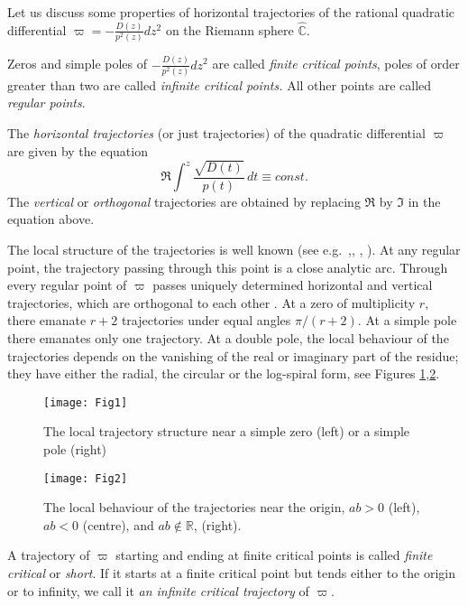 \documentclass[12pt]{amsart}
\begin{document}
Let us discuss some properties of horizontal trajectories of the rational
quadratic differential $\varpi =-\displaystyle\frac{D\left( z\right) }{p^{2}\left( z\right) }dz^{2}$ on the Riemann sphere $\hat{\mathbb{C}}.$

Zeros and simple poles of $-\displaystyle\frac{D\left( z\right) }{p^{2}\left( z\right) }dz^{2}$ are called \emph{finite critical points},
poles of order greater than two are called \emph{infinite critical points. }All other points are called \emph{regular points}.

The \emph{horizontal trajectories} (or just trajectories) of the quadratic
differential $\varpi $ are given by the equation 
\begin{equation}
\mathcal{\Re }\int^{z}\frac{\sqrt{D\left( t\right) }}{p\left( t\right) }\,dt\equiv const.  \label{re}
\end{equation}The \emph{vertical} or \emph{orthogonal} trajectories are obtained by
replacing $\Re $ by $\Im $ in the equation above.

The local structure of the trajectories is well known (see e.g.\cite{Strebel:84}~,\cite{MR0096806}, \cite{Pommerenke75}, \cite{MR1929066}). At
any regular point, the trajectory passing through this point is a close
analytic arc. Through every regular point of $\varpi $ passes uniquely
determined horizontal and vertical trajectories, which are orthogonal to
each other \cite[Theorem 5.5]{Strebel:84}. At a zero of multiplicity $r,$
there emanate $r+2$ trajectories under equal angles $\pi /\left( r+2\right) .
$ At a simple pole there emanates only one trajectory. At a double pole, the
local behaviour of the trajectories depends on the vanishing of the real or
imaginary part of the residue; they have either the radial, the circular or
the log-spiral form, see Figures \ref{Fig1},\ref{Fig2}.

\begin{figure}[h]
\begin{center}
\texttt{[image: Fig1]}
\caption[le titre]{ The local trajectory structure near a simple zero (left) or a simple pole (right)
}
\label{Fig1}
\end{center}
\end{figure}
\begin{figure}[h]
\begin{center}
\texttt{[image: Fig2]}
\caption[le titre]{ The local behaviour of the trajectories near the origin, $ab > 0$ (left), $ab < 0$ (centre), and $ab \notin  \mathbb{R}$, (right).}
\label{Fig2}
\end{center}
\end{figure}
A trajectory of $\varpi $ starting and ending at finite critical points is
called \emph{finite critical} or \emph{short}. If it starts at a finite
critical point but tends either to the origin or to infinity, we call it 
\emph{an infinite critical trajectory} of $\varpi $.
\end{document}
